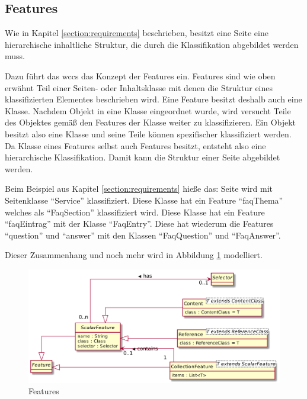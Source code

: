     \subsection{Features}
        \label{section:conceptFeatures}
        Wie in Kapitel \ref{section:requirements} beschrieben, besitzt eine Seite eine
        hierarchische inhaltliche Struktur, die durch die Klassifikation abgebildet werden muss.

        Dazu führt das \gls{wccs} das Konzept der Features ein.
        Features sind wie oben erwähnt Teil einer Seiten- oder Inhaltsklasse
        mit denen die Struktur eines klassifizierten Elementes beschrieben wird.
        Eine Feature besitzt deshalb auch eine Klasse.
        Nachdem Objekt in eine Klasse eingeordnet wurde,
        wird versucht Teile des Objektes gemäß den Features der Klasse weiter zu klassifizieren.
        Ein Objekt besitzt also eine Klasse und seine Teile können spezifischer klassifiziert werden.
        Da Klasse eines Features selbst auch Features besitzt, entsteht also eine hierarchische Klassifikation.
        Damit kann die Struktur einer Seite abgebildet werden.

        Beim Beispiel aus Kapitel \ref{section:requirements} hieße das:
        Seite wird mit Seitenklasse "`Service"' klassifiziert.
        Diese Klasse hat ein Feature "`faqThema"' welches als "`FaqSection"'
        klassifiziert wird.
        Diese Klasse hat ein Feature "`faqEintrag"' mit der Klasse "`FaqEntry"'.
        Diese hat wiederum die Features "`question"' und "`answer"' mit den Klassen
        "`FaqQuestion"' und "`FaqAnswer"'.

        Dieser Zusammenhang und noch mehr wird in Abbildung \ref{image:conceptFeatures} modelliert.

        \begin{figure}[htb]
            \centering
            \includegraphics[width=\textwidth]{../resources/concept/features.png}
            \caption{Features}
            \label{image:conceptFeatures}
        \end{figure}

